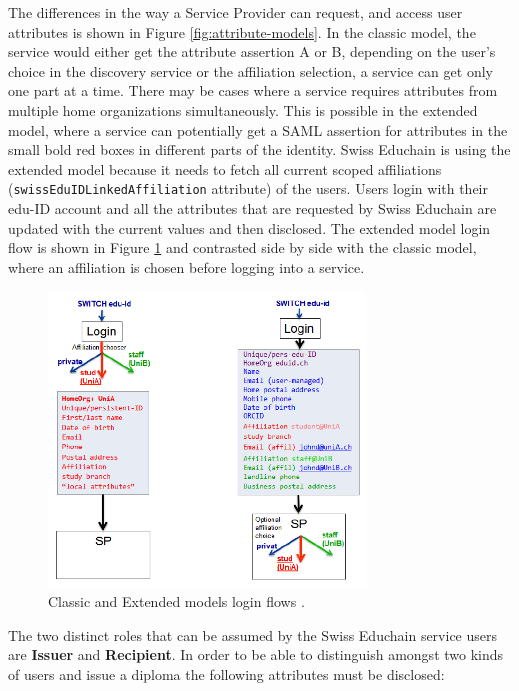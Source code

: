 The differences in the way a Service Provider can request, and access user attributes is shown in Figure \ref{fig:attribute-models}. In the classic model, the service would either get the attribute assertion A or B, depending on the user's choice in the discovery service or the affiliation selection, a service can get only one part at a time. There may be cases where a service requires attributes from multiple home organizations simultaneously. This is possible in the extended model, where a service can potentially get a SAML assertion for attributes in the small bold red boxes in different parts of the identity. Swiss Educhain is using the extended model because it needs to fetch all current scoped affiliations (\texttt{swissEduIDLinkedAffiliation} attribute) of the users. Users login with their edu-ID account and all the attributes that are requested by Swiss Educhain are updated with the current values and then disclosed. The extended model login flow is shown in Figure \ref{fig:eduid-login-flows} and contrasted side by side with the classic model, where an affiliation is chosen before logging into a service.

\begin{figure}[ht!]
	\centering
	\includegraphics[width=0.75\textwidth]{figs/ch4/login-flows}
	\caption{Classic and Extended models login flows \cite{switch-eduid-services-presentation}.}
	\label{fig:eduid-login-flows}
\end{figure}

The two distinct roles that can be assumed by the Swiss Educhain service users are \textbf{Issuer} and \textbf{Recipient}. In order to be able to distinguish amongst two kinds of users and issue a diploma the following attributes must be disclosed:

